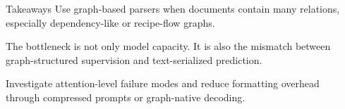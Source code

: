 \documentclass[final]{beamer}
\newlength{\sepwidth}
\newlength{\colwidth}
\newcommand{\separatorcolumn}{\begin{column}{\sepwidth}\end{column}}
\begin{document}
\begin{frame}[t]
\begin{columns}[t]
\begin{column}{\colwidth}
  \begin{exampleblock}{Takeaways}
    Use graph-based parsers when documents contain many relations, especially dependency-like or recipe-flow graphs.

    The bottleneck is not only model capacity. It is also the mismatch between graph-structured supervision and text-serialized prediction.

    Investigate attention-level failure modes and reduce formatting overhead through compressed prompts or graph-native decoding.
  \end{exampleblock}


\end{column}

\separatorcolumn
\end{columns}
\end{frame}
\end{document}
